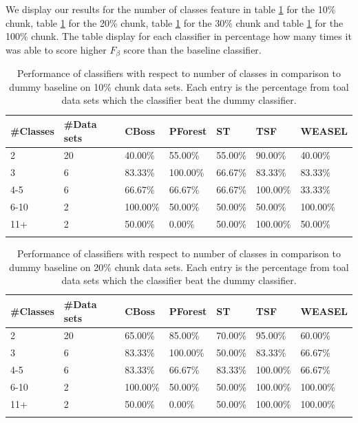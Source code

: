 We display our results for the number of classes feature in table \ref{TableNumClass10} for the 10\% chunk, table \ref{TableNumClass10} for the 20\% chunk, table \ref{TableNumClass10} for the 30\% chunk and table \ref{TableNumClass10} for the 100\% chunk.
The table display for each classifier in percentage how many times it was able to score higher $F_{\beta}$ score than the baseline classifier.

\begin{table}[hp!]
	\setlength\extrarowheight{2pt} %
	\begin{tabularx}{\textwidth}{|X|X|X|X|X|X|X|}
	\hline
	\textbf{\#Classes} & \textbf{\#Data sets} & \textbf{CBoss} & \textbf{PForest} & \textbf{ST} & \textbf{TSF} & \textbf{WEASEL} \\ \hline
		2 & 20 & 40.00\% & 55.00\% & 55.00\% & 90.00\% & 40.00\% \\ \hline
		3 & 6 & 83.33\% & 100.00\% & 66.67\% & 83.33\% & 83.33\% \\ \hline
		4-5 & 6 & 66.67\% & 66.67\% & 66.67\% & 100.00\% & 33.33\% \\ \hline
		6-10 & 2 & 100.00\% & 50.00\% & 50.00\% & 50.00\% & 100.00\% \\ \hline
		11+ & 2 & 50.00\% & 0.00\% & 50.00\% & 100.00\% & 50.00\% \\ \hline
  \caption{Performance of classifiers with respect to number of classes in comparison to dummy baseline on 10\% chunk data sets. Each entry is the percentage from toal data sets which the classifier beat the dummy classifier.}
  \label{TableNumClass10}
  \end{tabularx}
\end{table}

\begin{table}[hp!]
	\setlength\extrarowheight{2pt} %
	\begin{tabularx}{\textwidth}{|X|X|X|X|X|X|X|}
	\hline
	\textbf{\#Classes} & \textbf{\#Data sets} & \textbf{CBoss} & \textbf{PForest} & \textbf{ST} & \textbf{TSF} & \textbf{WEASEL} \\ \hline
		2 & 20 & 65.00\% & 85.00\% & 70.00\% & 95.00\% & 60.00\% \\ \hline
		3 & 6 & 83.33\% & 100.00\% & 50.00\% & 83.33\% & 66.67\% \\ \hline
		4-5 & 6 & 83.33\% & 66.67\% & 83.33\% & 100.00\% & 66.67\% \\ \hline
		6-10 & 2 & 100.00\% & 50.00\% & 50.00\% & 100.00\% & 100.00\% \\ \hline
		11+ & 2 & 50.00\% & 0.00\% & 50.00\% & 100.00\% & 100.00\% \\ \hline
  \caption{Performance of classifiers with respect to number of classes in comparison to dummy baseline on 20\% chunk data sets. Each entry is the percentage from toal data sets which the classifier beat the dummy classifier.}
  \label{TableNumClass20}
  \end{tabularx}
\end{table}

